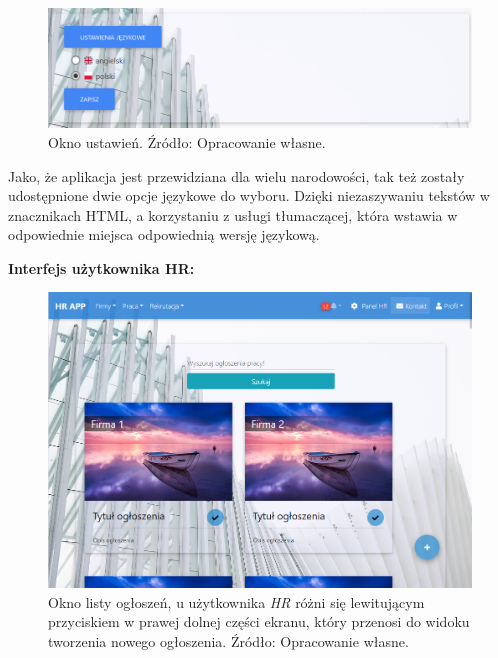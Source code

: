 \documentclass[twoside]{projektInzynierskiMS}
\numberwithin{figure}{section}
\begin{document}
\begin{figure}[h!]
    \centering
    \includegraphics[width = \textwidth]{images/ustawienia.png}
    \caption{Okno ustawień. Źródło: Opracowanie własne.}
    \label{fig:okno_ustawień}
\end{figure}

Jako, że aplikacja jest przewidziana dla wielu narodowości, tak też zostały udostępnione dwie opcje językowe do wyboru. Dzięki niezaszywaniu tekstów w znacznikach HTML, a korzystaniu z usługi tłumaczącej, która wstawia w odpowiednie miejsca odpowiednią wersję językową.

\newpage

\textbf{Interfejs użytkownika HR:}
\begin{figure}[h!]
    \centering
    \includegraphics[scale=0.5]{images/listaOgłoszeńHR.png}
    \caption{Okno listy ogłoszeń, u użytkownika \textit{HR} różni się lewitującym przyciskiem w prawej dolnej części ekranu, który przenosi do widoku tworzenia nowego ogłoszenia. Źródło: Opracowanie własne.}
    \label{fig:lista_ogłoszeń_hr}
\end{figure}

\newpage
\end{document}
